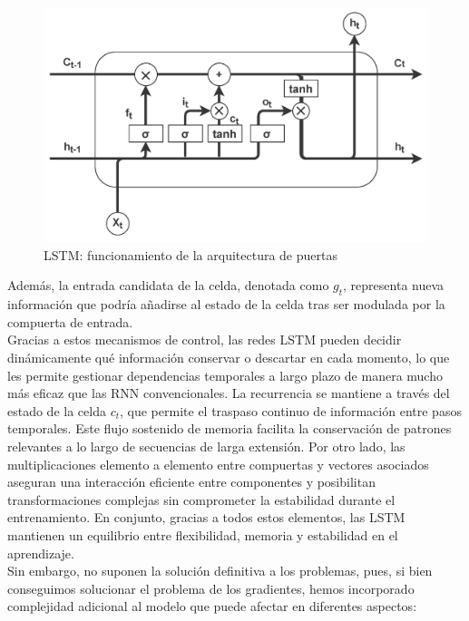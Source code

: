 \begin{figure}[H] %
    \centering
    \includegraphics[scale=1]{img/lstm}
    \caption{LSTM: funcionamiento de la arquitectura de puertas~\cite{Oliveira2021EnergyForecast}}
    \label{lstm}
\end{figure}


Además, la entrada candidata de la celda, denotada como $g_t$, representa nueva información que podría añadirse al estado de la celda tras ser modulada por la compuerta de entrada.\\

Gracias a estos mecanismos de control, las redes LSTM pueden decidir dinámicamente qué información conservar o descartar en cada momento, lo que les permite gestionar dependencias temporales a largo plazo de manera mucho más eficaz que las RNN convencionales. La recurrencia se mantiene a través del estado de la celda $c_t$, que permite el traspaso continuo de información entre pasos temporales. Este flujo sostenido de memoria facilita la conservación de patrones relevantes a lo largo de secuencias de larga extensión. Por otro lado, las multiplicaciones elemento a elemento entre compuertas y vectores asociados aseguran una interacción eficiente entre componentes y posibilitan transformaciones complejas sin comprometer la estabilidad durante el entrenamiento. En conjunto, gracias a todos estos elementos, las LSTM mantienen un equilibrio entre flexibilidad, memoria y estabilidad en el aprendizaje.\\

Sin embargo, no suponen la solución definitiva a los problemas, pues, si bien conseguimos solucionar el problema de los gradientes, hemos incorporado complejidad adicional al modelo que puede afectar en diferentes aspectos:

